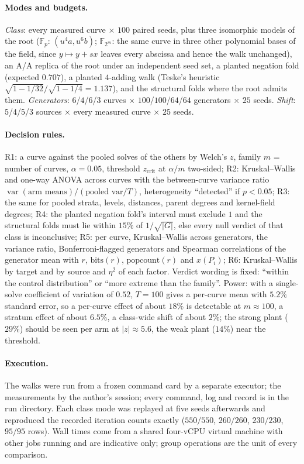 \documentclass[10pt,a4paper]{article}
\theoremstyle{remark}
\newcommand{\FF}{\mathbb{F}}
\begin{document}
\paragraph{Modes and budgets.} \emph{Class}: every measured curve $\times$
$100$ paired seeds, plus three isomorphic models of the root
($\FF_p$: $(u^4 a, u^6 b)$; $\FF_{2^m}$: the same curve in three other
polynomial bases of the field, since $y \mapsto y + sx$ leaves every abscissa
and hence the walk unchanged), an A/A replica of the root under an
independent seed set, a planted negation fold (expected $0.707$), a planted
$4$-adding walk (Teske's heuristic $\sqrt{1 - 1/32}/\sqrt{1 - 1/4} = 1.137$),
and the structural folds where the root admits them. \emph{Generators}:
$6$/$4$/$6$/$3$ curves $\times$ $100$/$100$/$64$/$64$ generators $\times$ $25$
seeds. \emph{Shift}: $5$/$4$/$5$/$3$ sources $\times$ every measured curve
$\times$ $25$ seeds.

\paragraph{Decision rules.} R1: a curve against the pooled solves of the
others by Welch's $z$, family $m$ = number of curves, $\alpha = 0.05$,
threshold $z_{\mathrm{crit}}$ at $\alpha/m$ two-sided; R2: Kruskal--Wallis
and one-way ANOVA across curves with the between-curve variance ratio
$\operatorname{var}(\text{arm means})/(\text{pooled var}/T)$, heterogeneity
``detected'' if $p < 0.05$; R3: the same for pooled strata, levels,
distances, parent degrees and kernel-field degrees; R4: the planted
negation fold's interval must exclude $1$ and the structural folds must lie
within $15\%$ of $1/\sqrt{|G|}$, else every null verdict of that class is
inconclusive; R5: per curve, Kruskal--Wallis across generators, the variance
ratio, Bonferroni-flagged generators and Spearman correlations of the
generator mean with $r$, $\mathrm{bits}(r)$, $\mathrm{popcount}(r)$ and
$x(P_i)$; R6: Kruskal--Wallis by target and by source and $\eta^2$ of each
factor. Verdict wording is fixed: ``within the control distribution'' or
``more extreme than the family''. Power: with a single-solve coefficient of
variation of $0.52$, $T = 100$ gives a per-curve mean with $5.2\%$ standard
error, so a per-curve effect of about $18\%$ is detectable at $m \approx 100$,
a stratum effect of about $6.5\%$, a class-wide shift of about $2\%$; the
strong plant ($29\%$) should be seen per arm at $|z| \approx 5.6$, the weak
plant ($14\%$) near the threshold.

\paragraph{Execution.} The walks were run from a frozen command card by a
separate executor; the measurements by the author's session; every command,
log and record is in the run directory. Each class mode was replayed at five
seeds afterwards and reproduced the recorded iteration counts exactly
($550/550$, $260/260$, $230/230$, $95/95$ rows). Wall times come from a shared
four-vCPU virtual machine with other jobs running and are indicative only;
group operations are the unit of every comparison.
\end{document}

